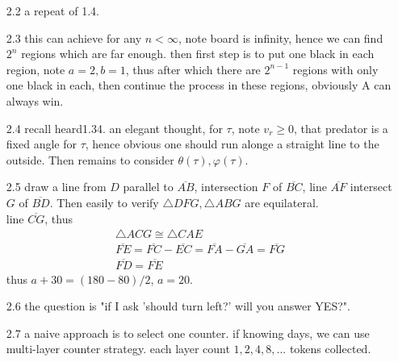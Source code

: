 \documentclass[paper=a4, fontsize=11pt]{scrartcl} %
\numberwithin{equation}{section} %
\numberwithin{figure}{section} %
\numberwithin{table}{section} %
\begin{document}
\begin{itemize}
	 \item[2.2] a repeat of 1.4.
	 \item[2.3] this can achieve for any $n<\infty$, note board is infinity, hence we can find $2^n$ regions which are far enough. then first step is to put one black in each region, note $a=2,b=1$, thus after which there are $2^{n-1}$ regions with only one black in each, then continue the process in these regions, obviously A can always win.
	 \item[2.4] recall heard1.34. an elegant thought, for $\tau$, note $v_r\geq 0$, that predator is a fixed angle for $\tau$, hence obvious one should run alonge a straight line to the outside. Then remains to consider $\theta(\tau),\varphi(\tau)$.
	 \item[2.5] draw a line from $D$ parallel to $\overline{AB}$, intersection $F$ of $\overline{BC}$, line $\overline{AF}$ intersect $G$ of $\overline{BD}$. Then easily to verify $\bigtriangleup DFG,\bigtriangleup ABG$ are equilateral.\\
	 line $\overline{CG}$, thus
	 \begin{align}
	 	\bigtriangleup ACG \cong \bigtriangleup CAE \\
	 	\overline{FE} = \overline{FC} -\overline{EC} = \overline{FA} - \overline{GA} = \overline{FG}\\
	 	\overline{FD} = \overline{FE}
	 \end{align}
	 thus $a+30 = (180-80)/2$, $a = 20$.
	 \item[2.6] the question is "if I ask 'should turn left?' will you answer YES?".
	 \item[2.7] a naive approach is to select one counter. if knowing days, we can use multi-layer counter strategy. each layer count $1,2,4,8,...$ tokens collected.
\end{itemize}
\end{document}
